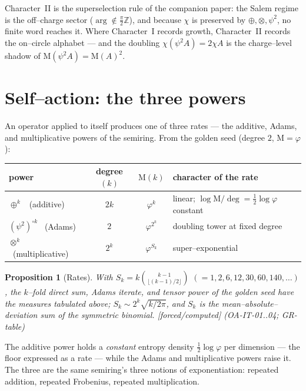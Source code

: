 \documentclass[11pt]{article}
\newcommand{\stag}[1]{{\small\textsf{\textcolor{tagcol}{[#1]}}}}
\newcommand{\bk}[1]{{\small\textsf{(#1)}}}
\theoremstyle{plain}
\newtheorem{proposition}[theorem]{Proposition}
\theoremstyle{definition}
\newcommand{\Z}{\mathbb{Z}}
\newcommand{\psitwo}{\psi^{2}}
\newcommand{\dsum}{\oplus}
\newcommand{\dten}{\otimes}
\newcommand{\Mahler}{\mathrm{M}}
\newcommand{\charge}{\chi}
\begin{document}
\noindent Character~II is the superselection rule of the companion paper: the Salem regime is the off--charge sector ($\arg\notin\tfrac\pi2\Z$), and because $\charge$ is preserved by $\dsum,\dten,\psitwo$, no finite word reaches it. Where Character~I records growth, Character~II records the on--circle alphabet --- and the doubling $\charge(\psitwo A)=2\charge A$ is the charge--level shadow of $\Mahler(\psitwo A)=\Mahler(A)^2$.

\section{Self--action: the three powers}\label{sec:self}

An operator applied to itself produces one of three rates --- the additive, Adams, and multiplicative powers of the semiring. From the golden seed (degree $2$, $\Mahler=\varphi$):

\begin{center}
\renewcommand{\arraystretch}{1.25}
\begin{tabular}{@{}lccl@{}}
\toprule
power & degree$(k)$ & $\Mahler(k)$ & character of the rate \\
\midrule
$\dsum^{k}$ \ (additive) & $2k$ & $\varphi^{k}$ & linear; $\log\Mahler/\deg=\tfrac12\log\varphi$ constant \\
$(\psitwo)^{\circ k}$ \ (Adams) & $2$ & $\varphi^{2^{k}}$ & doubling tower at fixed degree \\
$\dten^{k}$ \ (multiplicative) & $2^{k}$ & $\varphi^{S_k}$ & super--exponential \\
\bottomrule
\end{tabular}
\end{center}

\begin{proposition}[Rates]\label{prop:rates}
With $S_k=k\binom{k-1}{\lfloor(k-1)/2\rfloor}$ $(=1,2,6,12,30,60,140,\dots)$, the $k$--fold direct sum, Adams iterate, and tensor power of the golden seed have the measures tabulated above; $S_k\sim 2^k\sqrt{k/2\pi}$, and $S_k$ is the mean--absolute--deviation sum of the symmetric binomial. \stag{forced/computed} \bk{OA-IT-01..04; GR-table}
\end{proposition}

\noindent The additive power holds a \emph{constant} entropy density $\tfrac12\log\varphi$ per dimension --- the floor expressed as a rate --- while the Adams and multiplicative powers raise it. The three are the same semiring's three notions of exponentiation: repeated addition, repeated Frobenius, repeated multiplication.
\end{document}
